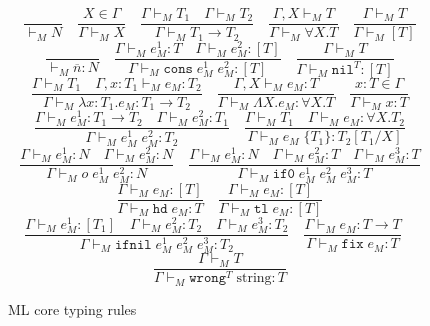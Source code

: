 \begin{figure}[tp]
\[
\frac{}{\vdash_{M}N}
\quad
\frac{X\in\Gamma}{\Gamma\vdash_{M}X}
\quad
\frac{\Gamma\vdash_{M}T_{1}\quad\Gamma\vdash_{M}T_{2}}{\Gamma\vdash_{M}T_{1}\rightarrow T_{2}}
\quad
\frac{\Gamma,X\vdash_{M}T}{\Gamma\vdash_{M}\forall X.T}
\quad
\frac{\Gamma\vdash_{M}T}{\Gamma\vdash_{M}[T]}
\]
\bigskip
\[
\frac{}{\vdash_{M}\overline{n}:N}
\quad
\frac{\Gamma\vdash_{M}e_{M}^{1}:T\quad\Gamma\vdash_{M}e_{M}^{2}:[T]}{\Gamma\vdash_{M}\mathtt{cons}\;e_{M}^{1}\;e_{M}^{2}:[T]}
\quad
\frac{\Gamma\vdash_{M}T}{\Gamma\vdash_{M}\mathtt{nil}^{T}:[T]}
\]
\[
\frac{\Gamma\vdash_{M}T_{1}\quad\Gamma,x:T_{1}\vdash_{M}e_{M}:T_{2}}{\Gamma\vdash_{M}\lambda x:T_{1}.e_{M}:T_{1}\rightarrow T_{2}}
\quad
\frac{\Gamma,X\vdash_{M}e_{M}:T}{\Gamma\vdash_{M}\Lambda X.e_{M}:\forall X.T}
\quad
\frac{x:T\in\Gamma}{\Gamma\vdash_{M}x:T}
\]
\[
\frac{\Gamma\vdash_{M}e_{M}^{1}:T_{1}\rightarrow T_{2}\quad\Gamma\vdash_{M}e_{M}^{2}:T_{1}}{\Gamma\vdash_{M}e_{M}^{1}\;e_{M}^{2}:T_{2}}
\quad
\frac{\Gamma\vdash_{M}T_{1}\quad\Gamma\vdash_{M}e_{M}:\forall X.T_{2}}{\Gamma\vdash_{M}e_{M}\;\lbrace T_{1}\rbrace:T_{2}[T_{1}/X]}
\]
\[
\frac{\Gamma\vdash_{M}e_{M}^{1}:N\quad\Gamma\vdash_{M}e_{M}^{2}:N}{\Gamma\vdash_{M}o\;e_{M}^{1}\;e_{M}^{2}:N}
\quad
\frac{\Gamma\vdash_{M}e_{M}^{1}:N\quad\Gamma\vdash_{M}e_{M}^{2}:T\quad\Gamma\vdash_{M}e_{M}^{3}:T}{\Gamma\vdash_{M}\mathtt{if0}\;e_{M}^{1}\;e_{M}^{2}\;e_{M}^{3}:T}
\]
\[
\frac{\Gamma\vdash_{M}e_{M}:[T]}{\Gamma\vdash_{M}\mathtt{hd}\;e_{M}:T}
\quad
\frac{\Gamma\vdash_{M}e_{M}:[T]}{\Gamma\vdash_{M}\mathtt{tl}\;e_{M}:[T]}
\]
\[
\frac{\Gamma\vdash_{M}e_{M}^{1}:[T_{1}]\quad\Gamma\vdash_{M}e_{M}^{2}:T_{2}\quad\Gamma\vdash_{M}e_{M}^{3}:T_{2}}{\Gamma\vdash_{M}\mathtt{ifnil}\;e_{M}^{1}\;e_{M}^{2}\;e_{M}^{3}:T_{2}}
\quad
\frac{\Gamma\vdash_{M}e_{M}:T\rightarrow T}{\Gamma\vdash_{M}\mathtt{fix}\;e_{M}:T}
\quad
\]
\[
\frac{\Gamma\vdash_{M}T}{\Gamma\vdash_{M}\mathtt{wrong}^{T}\;\mathrm{string}:T}
\]
\caption{ML core typing rules}
\label{mctr}
\end{figure}